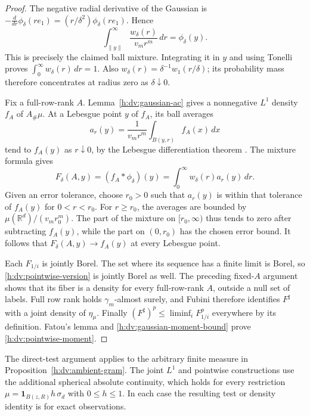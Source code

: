 \begin{proof}
The negative radial derivative of the Gaussian is
\(-\frac{d}{dr}\phi_\delta(re_1)
=(r/\delta^2)\phi_\delta(re_1)\).  Hence
\[
 \int_{\|y\|}^{\infty}\frac{w_\delta(r)}{v_mr^m}\,dr
 =\phi_\delta(y).
\]
This is precisely the claimed ball mixture.  Integrating it in \(y\)
and using Tonelli proves \(\int_0^\infty w_\delta(r)\,dr=1\).
Also \(w_\delta(r)=\delta^{-1}w_1(r/\delta)\); its probability mass
therefore concentrates at radius zero as \(\delta\downarrow0\).

Fix a full-row-rank \(A\).  Lemma~\ref{h:dv:gaussian-ac} gives a
nonnegative \(L^1\) density \(f_A\) of \(A_\#\mu\).  At a Lebesgue
point \(y\) of \(f_A\), its ball averages
\[
 a_r(y)=\frac{1}{v_mr^m}\int_{B(y,r)}f_A(x)\,dx
\]
tend to \(f_A(y)\) as \(r\downarrow0\), by the Lebesgue differentiation
theorem \cite[Theorem~1.6.19]{TaoMeasure2011}.  The mixture formula gives
\[
 F_\delta(A,y)
 =(f_A*\phi_\delta)(y)
 =\int_0^\infty w_\delta(r)a_r(y)\,dr.
\]
Given an error tolerance, choose \(r_0>0\) such that
\(a_r(y)\) is within that tolerance of \(f_A(y)\) for \(0<r<r_0\).
For \(r\ge r_0\), the averages are bounded by
\(\mu(\mathbb R^d)/(v_mr_0^m)\).  The part of the mixture on
\([r_0,\infty)\) thus tends to zero after subtracting \(f_A(y)\),
while the part on \((0,r_0)\) has the chosen error bound.  It follows
that \(F_\delta(A,y)\to f_A(y)\) at every Lebesgue point.

Each \(F_{1/i}\) is jointly Borel.  The set where its sequence has a
finite limit is Borel, so \eqref{h:dv:pointwise-version} is jointly
Borel as well.  The preceding fixed-\(A\) argument shows that its
fiber is a density for every full-row-rank \(A\), outside a null set
of labels.  Full row rank holds \(\gamma_m\)-almost surely, and
Fubini therefore identifies \(F^\sharp\) with a joint density of
\(\eta_\mu\).  Finally
\((F^\sharp)^p\le\liminf_i F_{1/i}^p\) everywhere by its definition.
Fatou's lemma and \eqref{h:dv:gaussian-moment-bound} prove
\eqref{h:dv:pointwise-moment}.
\end{proof}

The direct-test argument applies to the arbitrary finite
measure in Proposition~\ref{h:dv:ambient-gram}.  The joint \(L^1\) and
pointwise constructions use the additional spherical absolute
continuity, which holds for every restriction
\(\mu=\mathbf1_{B(z,R)}h\,\sigma_d\) with \(0\le h\le1\).
In each case the resulting test or density identity is for exact
observations.
